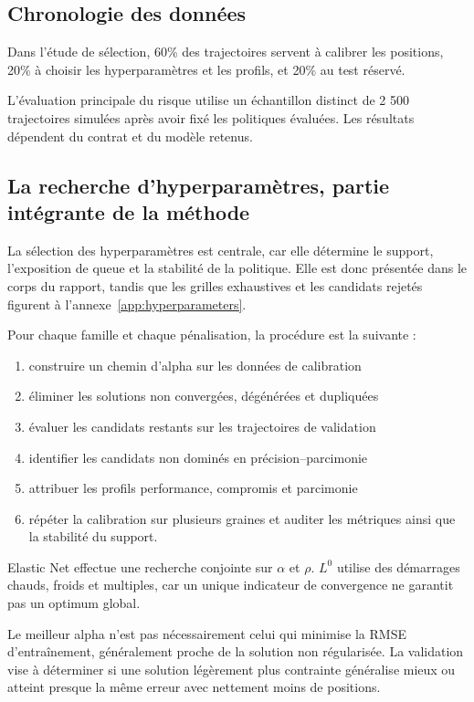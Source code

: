 \documentclass[12pt,a4paper]{article}
\newcommand{\1}{\mathbf{1}}
\begin{document}
\subsection{Chronologie des données}

Dans l'étude de sélection, 60\% des trajectoires servent à calibrer les positions, 20\% à choisir les hyperparamètres et les profils, et 20\% au test réservé.

L'évaluation principale du risque utilise un échantillon distinct de 2 500 trajectoires simulées après avoir fixé les politiques évaluées. Les résultats dépendent du contrat et du modèle retenus.

\subsection{La recherche d'hyperparamètres, partie intégrante de la méthode}

La sélection des hyperparamètres est centrale, car elle détermine le support, l'exposition de queue et la stabilité de la politique. Elle est donc présentée dans le corps du rapport, tandis que les grilles exhaustives et les candidats rejetés figurent à l'annexe~\ref{app:hyperparameters}.

Pour chaque famille et chaque pénalisation, la procédure est la suivante :

\begin{enumerate}
\item construire un chemin d'alpha sur les données de calibration
\item éliminer les solutions non convergées, dégénérées et dupliquées
\item évaluer les candidats restants sur les trajectoires de validation
\item identifier les candidats non dominés en précision--parcimonie
\item attribuer les profils performance, compromis et parcimonie
\item répéter la calibration sur plusieurs graines et auditer les métriques ainsi que la stabilité du support.
\end{enumerate}

Elastic Net effectue une recherche conjointe sur $\alpha$ et $\rho$. $L^0$ utilise des démarrages chauds, froids et multiples, car un unique indicateur de convergence ne garantit pas un optimum global.

Le meilleur alpha n'est pas nécessairement celui qui minimise la RMSE d'entraînement,
généralement proche de la solution non régularisée. La validation vise à déterminer
si une solution légèrement plus contrainte généralise mieux ou atteint presque la
même erreur avec nettement moins de positions.
\end{document}

